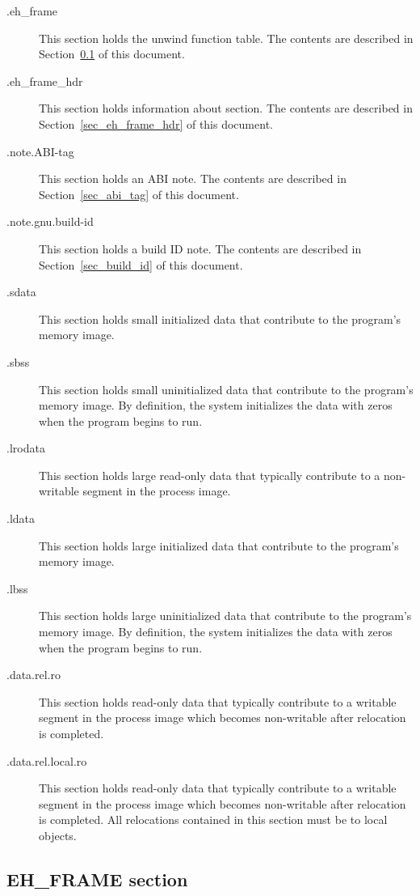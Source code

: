 \begin{description}
 \item[.eh_frame] This section holds the unwind function table.  The
   contents are described in Section~\ref{sec_eh_frame} of this document.
 \item[.eh_frame_hdr] This section holds information about
    section. The contents are described in
   Section~\ref{sec_eh_frame_hdr} of this document.
 \item[.note.ABI-tag] This section holds an ABI  note.  The contents are
   described in Section~\ref{sec_abi_tag} of this document.
 \item[.note.gnu.build-id] This section holds a build ID note.  The
   contents are described in Section~\ref{sec_build_id} of this document.
 \item[.sdata] This section holds small initialized data that
   contribute to the program's memory image.
 \item[.sbss] This section holds small uninitialized data that
   contribute to the program's memory image.  By definition, the system
   initializes the data with zeros when the program begins to run.
 \item[.lrodata] This section holds large read-only data that typically
   contribute to a non-writable segment in the process image.
 \item[.ldata] This section holds large initialized data that
   contribute to the program's memory image.
 \item[.lbss] This section holds large uninitialized data that
   contribute to the program's memory image.  By definition, the system
   initializes the data with zeros when the program begins to run.
 \item[.data.rel.ro] This section holds read-only data that typically
   contribute to a writable segment in the process image which becomes
   non-writable after relocation is completed.
 \item[.data.rel.local.ro] This section holds read-only data that
   typically contribute to a writable segment in the process image
   which becomes non-writable after relocation is completed.  All
   relocations contained in this section must be to local objects.
\end{description}

\subsection{EH\_FRAME section}
\label{sec_eh_frame}

